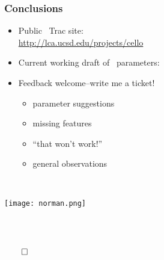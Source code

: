 \begin{frame}[fragile] 
   \frametitle{Conclusions}




\begin{itemize}
\item Public \cello\ Trac site: \\ \textcolor{blue}{\url{http://lca.ucsd.edu/projects/cello}}
\item Current working draft of \enzop\ parameters:
{\footnotesize{}}
\end{itemize}
\begin{minipage}{2.6in}
\begin{itemize}
\item Feedback welcome--write me a ticket!
\begin{itemize}
\item parameter suggestions
\item missing features
\item ``that won't work!''
\item general observations
\end{itemize}
\end{itemize}
\end{minipage} \
\begin{minipage}{1.2in}
   \centerline{\texttt{[image: norman.png]}}
\end{minipage}
\ \\
\ \\
\centerline{$\qed$}
\end{frame}

